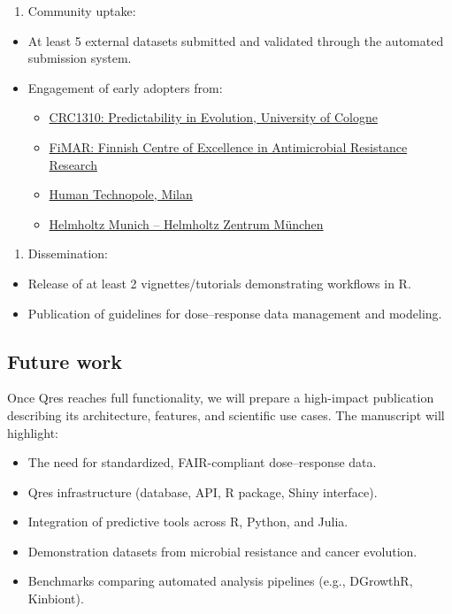 \documentclass[
  letterpaper,
  DIV=11,
  numbers=noendperiod]{scrartcl}
\providecommand{\tightlist}{%
  \setlength{\itemsep}{0pt}\setlength{\parskip}{0pt}}
\begin{document}
\begin{enumerate}
\def\labelenumi{\arabic{enumi}.}
\setcounter{enumi}{1}
\tightlist
\item
  Community uptake:
\end{enumerate}

\begin{itemize}
\item
  At least 5 external datasets submitted and validated through the
  automated submission system.
\item
  Engagement of early adopters from:

  \begin{itemize}
  \tightlist
  \item
    \href{https://crc1310.uni-koeln.de/}{CRC1310: Predictability in
    Evolution, University of Cologne}
  \item
    \href{https://www.fimar.fi/}{FiMAR: Finnish Centre of Excellence in
    Antimicrobial Resistance Research}
  \item
    \href{https://humantechnopole.it/en/}{Human Technopole, Milan}
  \item
    \href{https://www.helmholtz-munich.de/en}{Helmholtz Munich --
    Helmholtz Zentrum München}
  \end{itemize}
\end{itemize}

\begin{enumerate}
\def\labelenumi{\arabic{enumi}.}
\setcounter{enumi}{2}
\tightlist
\item
  Dissemination:
\end{enumerate}

\begin{itemize}
\tightlist
\item
  Release of at least 2 vignettes/tutorials demonstrating workflows in
  R.
\item
  Publication of guidelines for dose--response data management and
  modeling.
\end{itemize}

\subsection{Future work}\label{future-work}

Once Qres reaches full functionality, we will prepare a high-impact
publication describing its architecture, features, and scientific use
cases. The manuscript will highlight:

\begin{itemize}
\tightlist
\item
  The need for standardized, FAIR-compliant dose--response data.
\item
  Qres infrastructure (database, API, R package, Shiny interface).
\item
  Integration of predictive tools across R, Python, and Julia.
\item
  Demonstration datasets from microbial resistance and cancer evolution.
\item
  Benchmarks comparing automated analysis pipelines (e.g., DGrowthR,
  Kinbiont).
\end{itemize}
\end{document}
